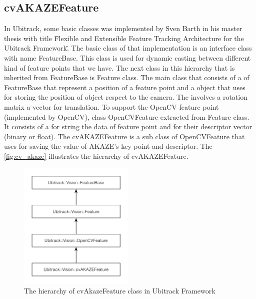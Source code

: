 \subsection {cvAKAZEFeature}
In Ubitrack, some basic classes was implemented by Sven Barth in his master thesis with title \"Flexible and Extensible Feature Tracking Architecture for the Ubitrack Framework\". The basic class of that implementation is an interface class with name FeatureBase. This class is used for dynamic casting between different kind of feature points that we have.
The next class in this hierarchy that is inherited from FeatureBase is Feature class. The main class that consists of a   of FeatureBase that represent a position of a feature point and a  object that uses for storing the position of object respect to the camera. The  involves a rotation matrix a vector for translation. To support the OpenCV feature point (implemented by OpenCV), class OpenCVFeature extracted from Feature class. It consists of a  for string the data of feature point and  for their descriptor vector (binary or float). The cvAKAZEFeature is a sub class of OpenCVFeature that uses for saving the value of AKAZE's key point and descriptor. The \autoref{fig:cv_akaze} illustrates the hierarchy of cvAKAZEFeature.

\begin{figure}[H]
  \centering
  \includegraphics[width=55mm]{figures/cv_akaze}
  \caption{The hierarchy of cvAkazeFeature class in Ubitrack Framework}\label{fig:cv_akaze}
\end{figure}
 
